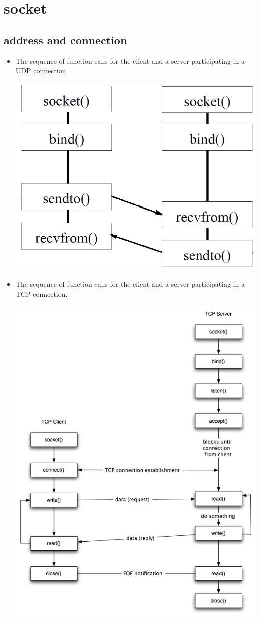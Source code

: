 \documentclass[a4paper,11pt,twoside]{book}
\begin{document}
\section{socket}

\subsection{address and connection}
\begin{itemize}
	\item The sequence of function calls for the client and a server participating in a UDP connection.
	\begin{center}
		\includegraphics[width=0.43\linewidth]{pics/udp.png}
	\end{center}

	\item The sequence of function calls for the client and a server participating in a TCP connection.
	
	\begin{center}
		\includegraphics[width=0.63\linewidth]{pics/socket.jpg}
	\end{center}


\end{itemize}
\end{document}
